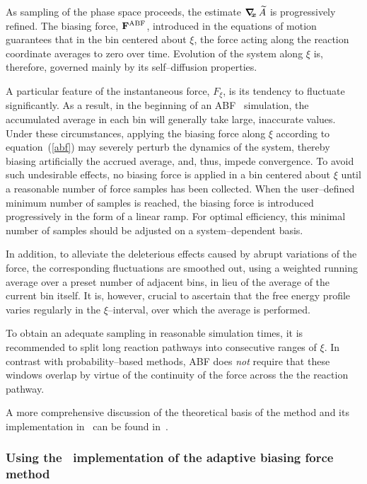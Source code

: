As sampling of the phase space proceeds, the estimate
$\mbox{\boldmath$\nabla_{\!\!x}\,$} \widetilde A$ is progressively refined. The biasing
force, ${\bf F}^{\rm ABF}$, introduced in the equations of
motion guarantees that in the bin centered about $\xi$,
the force acting along the reaction coordinate averages
to zero over time. Evolution of the system along $\xi$
is, therefore, governed mainly by its self--diffusion
properties.


A particular feature of the
instantaneous force, $F_\xi$,
is its tendency to fluctuate
significantly.
As a result, in the beginning of an ABF \ simulation,
the accumulated average in each bin will generally
take large, inaccurate
values. Under these circumstances,
applying the biasing force along $\xi$ according
to equation~({\ref{abf}}) may severely perturb
the dynamics of the system, thereby
biasing artificially the accrued average, and,
thus, impede convergence.
To avoid such undesirable effects,
no biasing force is applied in a bin centered about $\xi$
until a reasonable number of force samples
has been collected. When the user--defined minimum number
of samples is reached, the biasing force
is introduced progressively in the form
of a linear ramp.
For optimal efficiency, this minimal number of samples
should be adjusted on a system--dependent basis.


In addition, to alleviate the deleterious
effects caused by abrupt variations of the force,
the corresponding fluctuations are smoothed out,
using a weighted running average over a preset number
of adjacent bins, in lieu of the average of the
current bin itself. It is, however, crucial to ascertain
that the free energy profile varies regularly
in the $\xi$--interval, over which the
average is performed.

To obtain an adequate sampling in reasonable
simulation times, it is recommended to split long reaction
pathways into consecutive ranges of $\xi$. In contrast with
probability--based methods, ABF does
{\itshape not} require that these windows overlap by
virtue of the continuity of the force across the
the reaction pathway.


A more comprehensive discussion of the theoretical basis of
the method and its implementation
in \namd\ can be found in~\cite{heni_04_1}.



\subsubsection{Using the \namd\ implementation of the adaptive biasing force method}


